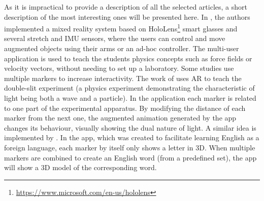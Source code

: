 As it is impractical to provide a description of all the selected articles, a short description of the most interesting ones will be presented here. In \cite{khan2018mathland}, the authors implemented a mixed reality system based on HoloLens\footnote{\url{https://www.microsoft.com/en-us/hololens}} smart glasses and several stretch and \gls{IMU} sensors, where the users can control and move augmented objects using their arms or an ad-hoc controller. The multi-user application is used to teach the students physics concepts such as force fields or velocity vectors, without needing to set up a laboratory. Some studies use multiple markers to increase interactivity. The work of \cite{wang2018augmented} uses AR to teach the double-slit experiment (a physics experiment demonstrating the characteristic of light being both a wave and a particle). In the application each marker is related to one part of the experimental apparatus. By modifying the distance of each marker from the next one, the augmented animation generated by the app changes its behaviour, visually showing the dual nature of light. A similar idea is implemented by \cite{boonbrahm2015using}. In the app, which was created to facilitate learning English as a foreign language, each marker by itself only shows a letter in 3D. When multiple markers are combined to create an English word (from a predefined set), the app will show a 3D model of the corresponding word.
\pagebreak

